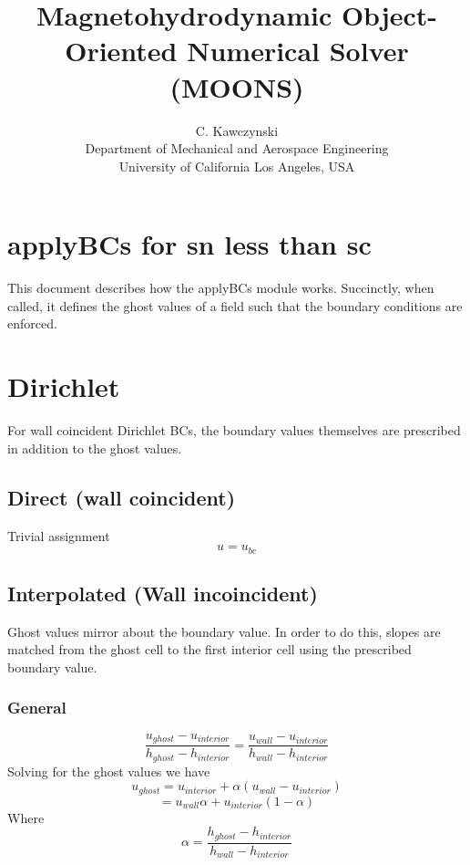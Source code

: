 \documentclass[11pt]{article}
\begin{document}
\doublespacing
\title{Magnetohydrodynamic Object-Oriented Numerical Solver (MOONS)}
\author{C. Kawczynski \\
Department of Mechanical and Aerospace Engineering \\
University of California Los Angeles, USA\\
}
\maketitle

\section{applyBCs for sn less than sc}

This document describes how the applyBCs module works. Succinctly, when called, it defines the ghost values of a field such that the boundary conditions are enforced.

\section{Dirichlet}
For wall coincident Dirichlet BCs, the boundary values themselves are prescribed in addition to the ghost values.

\subsection{Direct (wall coincident)}
Trivial assignment
\begin{equation}
u = u_{bc}
\end{equation}

\subsection{Interpolated (Wall incoincident)}
Ghost values mirror about the boundary value. In order to do this, slopes are matched from the ghost cell to the first interior cell using the prescribed boundary value.

\subsubsection{General}
\begin{equation}
	\frac{u_{ghost}-u_{interior}}{h_{ghost}-h_{interior}}
	=
	\frac{u_{wall}-u_{interior}}{h_{wall}-h_{interior}}
\end{equation}
Solving for the ghost values we have
\begin{equation}
	u_{ghost}
	=
	u_{interior} + \alpha (u_{wall}-u_{interior})
\end{equation}
\begin{equation}
	=
	u_{wall}\alpha + u_{interior}(1-\alpha)
\end{equation}
Where
\begin{equation}
	\alpha = \frac{h_{ghost}-h_{interior}}{h_{wall}-h_{interior}}
\end{equation}
\end{document}
